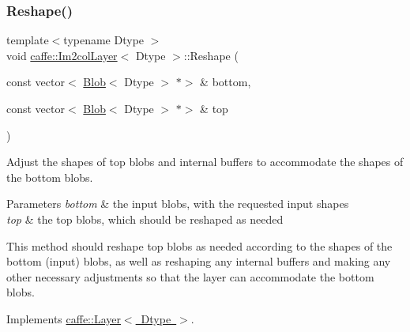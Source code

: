 \mbox{\label{classcaffe_1_1_im2col_layer_a119c9e1965e219be1ccb719821d4542f}} 
\subsubsection{\texorpdfstring{Reshape()}{Reshape()}\hspace{0.1cm}{\footnotesize\ttfamily [1/2]}}
{\footnotesize\ttfamily template$<$typename Dtype $>$ \\
void \mbox{\hyperlink{classcaffe_1_1_im2col_layer}{caffe\+::\+Im2col\+Layer}}$<$ Dtype $>$\+::Reshape (\begin{DoxyParamCaption}\item[{const vector$<$ \mbox{\hyperlink{classcaffe_1_1_blob}{Blob}}$<$ Dtype $>$ $\ast$$>$ \&}]{bottom,  }\item[{const vector$<$ \mbox{\hyperlink{classcaffe_1_1_blob}{Blob}}$<$ Dtype $>$ $\ast$$>$ \&}]{top }\end{DoxyParamCaption})\hspace{0.3cm}{\ttfamily [virtual]}}



Adjust the shapes of top blobs and internal buffers to accommodate the shapes of the bottom blobs. 


\begin{DoxyParams}{Parameters}
{\em bottom} & the input blobs, with the requested input shapes \\
\hline
{\em top} & the top blobs, which should be reshaped as needed\\
\hline
\end{DoxyParams}
This method should reshape top blobs as needed according to the shapes of the bottom (input) blobs, as well as reshaping any internal buffers and making any other necessary adjustments so that the layer can accommodate the bottom blobs. 

Implements \mbox{\hyperlink{classcaffe_1_1_layer_a7fe981e8af8d93d587acf2a952be563d}{caffe\+::\+Layer$<$ Dtype $>$}}.

\mbox{\label{classcaffe_1_1_im2col_layer_a18fcf2571b0c73b6dd828a7fc7caf5e6}} 
